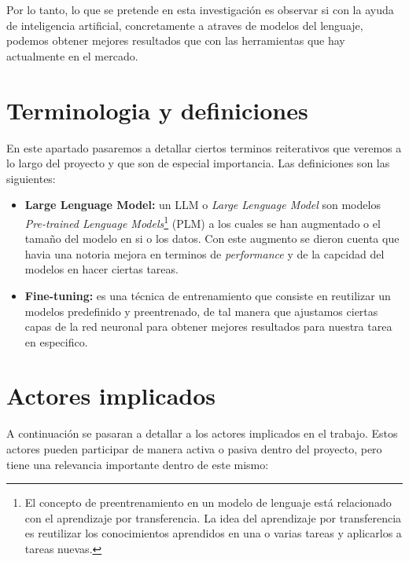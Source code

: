 Por lo tanto, lo que se pretende en esta investigación es observar si con la ayuda de inteligencia artificial, concretamente a atraves de modelos del lenguaje, podemos obtener mejores 
resultados que con las herramientas que hay actualmente en el mercado.

\section{Terminologia y definiciones}
\label{sec:terminalogia}

En este apartado pasaremos a detallar ciertos terminos reiterativos que veremos a lo largo del proyecto y que son de especial importancia. Las definiciones son las siguientes:

\begin{itemize}
    \item \textbf{Large Lenguage Model:} un LLM o \textit{Large Lenguage Model} son modelos \textit{Pre-trained Lenguage Models}\footnote{El concepto de preentrenamiento en un modelo 
                                         de lenguaje está relacionado con el aprendizaje por transferencia. La idea del aprendizaje por transferencia es reutilizar los conocimientos 
                                         aprendidos en una o varias tareas y aplicarlos a tareas nuevas.} (PLM) a los cuales se han augmentado o el tamaño del modelo en si o los datos.
                                         Con este augmento se dieron cuenta que havia una notoria mejora en terminos de \textit{performance} y de la capcidad del modelos en hacer 
                                         ciertas tareas. \cite{ZhaoWayneXin2023ASoL}
    \item \textbf{Fine-tuning:} es una técnica de entrenamiento que consiste en reutilizar un modelos predefinido y preentrenado, de tal manera que ajustamos ciertas capas de la 
                                red neuronal para obtener mejores resultados para nuestra tarea en especifico.
\end{itemize}

\section{Actores implicados}
\label{sec:terminalogia}

A continuación se pasaran a detallar a los actores implicados en el trabajo. Estos actores pueden participar de manera activa o pasiva dentro del proyecto, pero tiene una relevancia 
importante dentro de este mismo:

